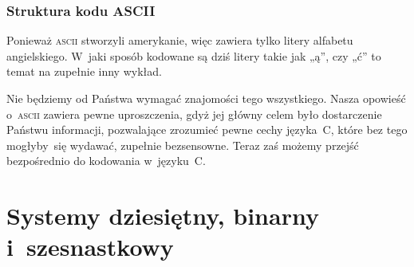 \documentclass[10pt,t]{beamer}
\begin{document}
\begin{frame}
  \frametitle{Struktura kodu ASCII}


  Ponieważ \textsc{ascii} stworzyli amerykanie, więc zawiera tylko litery
  alfabetu angielskiego. W~jaki sposób kodowane są dziś litery takie jak
  „ą”, czy „ć” to temat na zupełnie inny wykład.

  Nie będziemy od Państwa wymagać znajomości tego wszystkiego. Nasza opowieść
  o~\textsc{ascii} zawiera pewne uproszczenia, gdyż jej główny celem było
  dostarczenie Państwu informacji, pozwalające zrozumieć pewne cechy
  języka~C, które bez tego mogłyby~się wydawać, zupełnie bezsensowne.
  Teraz zaś możemy przejść bezpośrednio do kodowania w~języku~C.

\end{frame}










\section{Systemy dziesiętny, binarny i~szesnastkowy}
\end{document}
